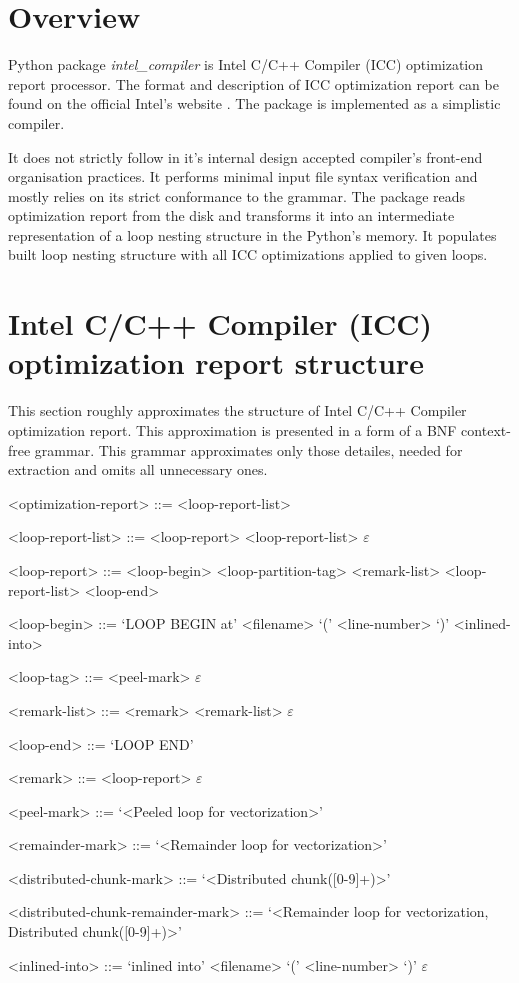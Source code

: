 \section{Overview}
\qquad Python package \textit{intel\_compiler} is Intel C/C++ Compiler (ICC) optimization report processor. The format and description of ICC optimization report can be found on the official Intel's website \cite{icc-optimization-reports}. The package is implemented as a simplistic compiler.  

It does not strictly follow in it's internal design accepted compiler's front-end organisation practices. It performs minimal input file syntax verification and mostly relies on its strict conformance to the grammar. The package reads optimization report from the disk and transforms it into an intermediate representation of a loop nesting structure in the Python's memory. It populates built loop nesting structure with all ICC optimizations \cite{bacon} applied to given loops.    

\section{Intel C/C++ Compiler (ICC) optimization report structure}
\qquad This section roughly approximates the structure of Intel C/C++ Compiler optimization report. This approximation is presented in a form of a BNF context-free grammar. This grammar approximates only those detailes, needed for extraction and omits all unnecessary ones.   

\begin{grammar}
	
<optimization-report> ::= <loop-report-list>

<loop-report-list> ::= <loop-report> <loop-report-list> 
\alt $\varepsilon$
	
<loop-report> ::= <loop-begin> <loop-partition-tag> <remark-list> <loop-report-list> <loop-end>

<loop-begin> ::= `LOOP BEGIN at' <filename> `(' <line-number> `)' <inlined-into>

<loop-tag> ::= <peel-mark> 
\alt $\varepsilon$

<remark-list> ::= <remark> <remark-list>
\alt $\varepsilon$

<loop-end> ::= `LOOP END'

<remark> ::= <loop-report> 
\alt $\varepsilon$


<peel-mark> ::= `<Peeled loop for vectorization>'

<remainder-mark> ::= `<Remainder loop for vectorization>'

<distributed-chunk-mark> ::= `<Distributed chunk([0-9]+)>'

<distributed-chunk-remainder-mark> ::= `<Remainder loop for vectorization, Distributed chunk([0-9]+)>'

<inlined-into> ::= `inlined into' <filename> `(' <line-number> `)' 	
\alt $\varepsilon$
	
\end{grammar}


